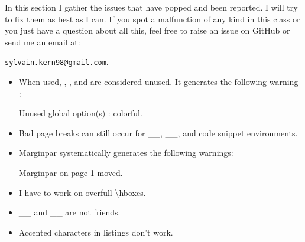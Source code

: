 \documentclass[
	raggedright,
	12pt,
	colorful,
]{tufte-style-article}
\begin{document}
In this section I gather the issues that have popped and been reported. I will try to fix them as best as I can. If you spot a malfunction of any kind in this class or you just have a question about all this, feel free to raise an issue on GitHub or send me an email at:

\href{mailto:sylvain.kern98@gmail.com}{\texttt{sylvain.kern98@gmail.com}}.

\bigskip

\begin{itemize}\tightlist
\item When used, , , and  are considered unused. It generates the following warning :
\begin{codebox}{}
Unused global option(s) : colorful.
\end{codebox}
\item Bad page breaks can still occur for _\textfig{}_, _\widefig{}_, and code snippet environments.
\item Marginpar systematically generates the following warnings:
\begin{codebox}{}
Marginpar on page 1 moved.
\end{codebox}
\item I have to work on overfull \textbackslash hboxes.
\item {}_\inlinecode_ and _\sidenote_ are not friends.
\item Accented characters in listings don't work.
\end{itemize}
\end{document}
